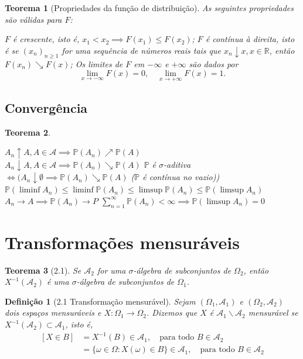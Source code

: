 \documentclass[12pt,a4paper,answers]{article}
\numberwithin{equation}{section} %
\newcommand{\inv}[1]{#1^{-1}}      %
\renewcommand{\Re}{\mathbb{R}}
\renewcommand{\P}{\mathbb{P}}
\newcommand{\Acal}{\mathcal{A}}
\newcommand{\sig}{$\sigma$}
\theoremstyle{thm_estilo}
\newtheorem{theorem}{Teorema}[section]
\newtheorem{definition}{Definição}[section]
\theoremstyle{thm_note_est}
\begin{document}
\begin{theorem}[Propriedades da função de distribuição] As seguintes propriedades são válidas para $F$:
	\begin{outline}[enumerate]
		\1 $F$ é crescente, isto é, \(x_1<x_2 \implies F(x_1)\leq F(x_2)\);
		\1 $F$ é contínua à direita, isto é se $(x_n)_{n\geq1}$ for uma sequência de números reais tais que \(x_n\downarrow x, x\in \Re\), então \(F(x_n)\searrow F(x)\);
		\1 Os limites de $F$ em $-\infty$ e $+\infty$ são dados por
		\[
			\lim\limits_{x\to-\infty}F(x)=0, \quad \lim\limits_{x\to+\infty}F(x)=1.
		\]
	\end{outline}
\end{theorem}

\subsection{Convergência}

\begin{theorem}
	\leavevmode
	\begin{outline}[enumerate]
		\1 \( A_n \uparrow A, A \in \Acal \implies \P(A_n) \nearrow \P(A) \) \\
		\( A_n \downarrow A, A \in \Acal \implies \P(A_n) \searrow \P(A) \)
		\1 $\P$ é $\sigma$-aditiva $\iff (A_n\downarrow\emptyset \implies \P(A_n) \searrow \P(A)$ ($\P$ é contínua no vazio))
		\1 \( \P(\liminf A_n) \leq \liminf\P(A_n) \leq \limsup\P(A_n) \leq \P(\limsup A_n) \)
		\1 \( A_n \to A \implies \P(A_n)\to P\)
		\1 \(\sum_{n=1}^{\infty}\P(A_n)<\infty \implies \P(\limsup A_n)=0\)
	\end{outline}
\end{theorem}

\section{Transformações mensuráveis}

\begin{theorem}[2.1]
	Se $\Acal_2$ for uma \sig-álgebra de subconjuntos de $\Omega_2$, então $\inv{X}(\Acal_2)$ é uma \sig-álgebra de subconjuntos de $\Omega_1$.
\end{theorem}

\begin{definition}[2.1 Transformação mensurável]
	Sejam $(\Omega_1, \Acal_1)$ e $(\Omega_2, \Acal_2)$ dois espaços mensuráveis e $X\colon\Omega_1\to\Omega_2$. Dizemos que $X$ é $\Acal_1\backslash\Acal_2$ mensurável se $\inv{X}(\Acal_2) \subset \Acal_1$, isto é,
	\begin{equation}
		\begin{aligned}
			[X\in B] &= \inv{X}(B)\in\Acal_1, \quad \text{para todo } B \in \Acal_2 \\
		      	     &= \{\omega \in \Omega: X(\omega) \in B \}  \in \Acal_1,  \quad \text{para todo } B \in \Acal_2
		\end{aligned}
	\end{equation}
\end{definition}
\end{document}
